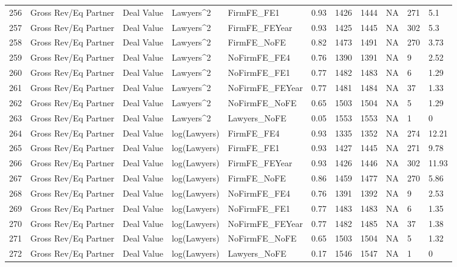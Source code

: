 \documentclass{article}
\begin{document}
\begin{table}[H]
\begin{tabular}{rllllllllll}
  256 & Gross Rev/Eq Partner & Deal Value & Lawyers^2 & FirmFE\_FE1 & 0.93 & 1426 & 1444 & NA & 271 & 5.1 \\ 
  257 & Gross Rev/Eq Partner & Deal Value & Lawyers^2 & FirmFE\_FEYear & 0.93 & 1425 & 1445 & NA & 302 & 5.3 \\ 
  258 & Gross Rev/Eq Partner & Deal Value & Lawyers^2 & FirmFE\_NoFE & 0.82 & 1473 & 1491 & NA & 270 & 3.73 \\ 
  259 & Gross Rev/Eq Partner & Deal Value & Lawyers^2 & NoFirmFE\_FE4 & 0.76 & 1390 & 1391 & NA & 9 & 2.52 \\ 
  260 & Gross Rev/Eq Partner & Deal Value & Lawyers^2 & NoFirmFE\_FE1 & 0.77 & 1482 & 1483 & NA & 6 & 1.29 \\ 
  261 & Gross Rev/Eq Partner & Deal Value & Lawyers^2 & NoFirmFE\_FEYear & 0.77 & 1481 & 1484 & NA & 37 & 1.33 \\ 
  262 & Gross Rev/Eq Partner & Deal Value & Lawyers^2 & NoFirmFE\_NoFE & 0.65 & 1503 & 1504 & NA & 5 & 1.29 \\ 
  263 & Gross Rev/Eq Partner & Deal Value & Lawyers^2 & Lawyers\_NoFE & 0.05 & 1553 & 1553 & NA & 1 & 0 \\ 
  264 & Gross Rev/Eq Partner & Deal Value & log(Lawyers) & FirmFE\_FE4 & 0.93 & 1335 & 1352 & NA & 274 & 12.21 \\ 
  265 & Gross Rev/Eq Partner & Deal Value & log(Lawyers) & FirmFE\_FE1 & 0.93 & 1427 & 1445 & NA & 271 & 9.78 \\ 
  266 & Gross Rev/Eq Partner & Deal Value & log(Lawyers) & FirmFE\_FEYear & 0.93 & 1426 & 1446 & NA & 302 & 11.93 \\ 
  267 & Gross Rev/Eq Partner & Deal Value & log(Lawyers) & FirmFE\_NoFE & 0.86 & 1459 & 1477 & NA & 270 & 5.86 \\ 
  268 & Gross Rev/Eq Partner & Deal Value & log(Lawyers) & NoFirmFE\_FE4 & 0.76 & 1391 & 1392 & NA & 9 & 2.53 \\ 
  269 & Gross Rev/Eq Partner & Deal Value & log(Lawyers) & NoFirmFE\_FE1 & 0.77 & 1483 & 1483 & NA & 6 & 1.35 \\ 
  270 & Gross Rev/Eq Partner & Deal Value & log(Lawyers) & NoFirmFE\_FEYear & 0.77 & 1482 & 1485 & NA & 37 & 1.38 \\ 
  271 & Gross Rev/Eq Partner & Deal Value & log(Lawyers) & NoFirmFE\_NoFE & 0.65 & 1503 & 1504 & NA & 5 & 1.32 \\ 
  272 & Gross Rev/Eq Partner & Deal Value & log(Lawyers) & Lawyers\_NoFE & 0.17 & 1546 & 1547 & NA & 1 & 0 \\ 

\end{tabular}
\end{table}
\end{document}
